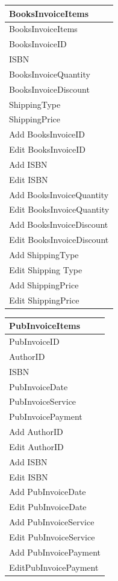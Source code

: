 \begin{tabular}{|p{2.5cm}|}
    \hline
    \textbf{BooksInvoiceItems} \\ \hline
    BooksInvoiceItems \\ BooksInvoiceID \\ ISBN \\ BooksInvoiceQuantity \\ BooksInvoiceDiscount \\ ShippingType \\ ShippingPrice \\ \hline
    Add BooksInvoiceID \\ Edit BooksInvoiceID \\ Add ISBN \\ Edit ISBN \\ Add BooksInvoiceQuantity \\ Edit BooksInvoiceQuantity \\ Add BooksInvoiceDiscount \\ Edit BooksInvoiceDiscount \\ Add ShippingType \\ Edit Shipping Type \\ Add ShippingPrice \\ Edit ShippingPrice \\ \hline
\end{tabular}

\begin{tabular}{|p{2.5cm}|}
    \hline
    \textbf{PubInvoiceItems} \\ \hline
    PubInvoiceID \\ AuthorID \\ ISBN \\ PubInvoiceDate \\ PubInvoiceService \\ PubInvoicePayment \\ \hline
    Add AuthorID \\ Edit AuthorID \\ Add ISBN \\ Edit ISBN \\ Add PubInvoiceDate \\ Edit PubInvoiceDate \\ Add PubInvoiceService \\ Edit PubInvoiceService \\ Add PubInvoicePayment \\ EditPubInvoicePayment \\ \hline
\end{tabular}

